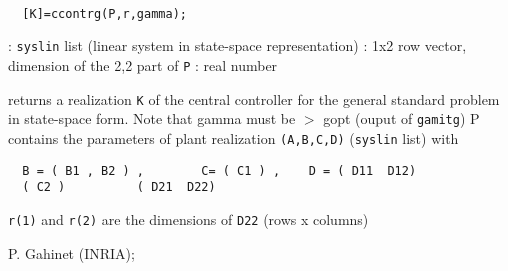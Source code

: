 \begin{mandesc}
   \\ %
\end{mandesc}
\begin{calling_sequence}
\begin{verbatim}
  [K]=ccontrg(P,r,gamma);  
\end{verbatim}
\end{calling_sequence}
\begin{parameters}
  \begin{varlist}
    : \verb!syslin! list (linear system in state-space representation)
    : 1x2 row vector, dimension of the 2,2 part of \verb!P!
    : real number
  \end{varlist}
\end{parameters}
\begin{mandescription}
  returns a realization \verb!K! of the central controller for the
  general standard problem in state-space form.
  Note that gamma must be $>$ gopt (ouput of \verb!gamitg!)
  P contains the parameters of plant realization \verb!(A,B,C,D)!
  (\verb!syslin! list) with
\begin{verbatim}
  B = ( B1 , B2 ) ,        C= ( C1 ) ,    D = ( D11  D12)
  ( C2 )          ( D21  D22)
\end{verbatim}
\verb!r(1)! and \verb!r(2)! are the dimensions of \verb!D22! (rows x columns)
\end{mandescription}
\begin{manseealso}
     
\end{manseealso}
\begin{authors}
  P. Gahinet (INRIA);   
\end{authors}
